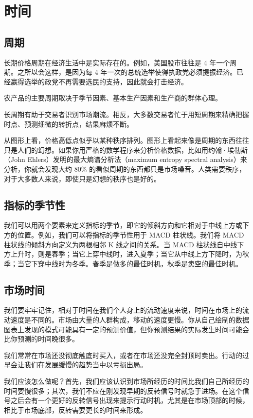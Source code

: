 \section{时间}
\subsection*{周期}
长期价格周期在经济生活中是实际存在的。例如，美国股市往往是 4 年一个周期。之所以会这样，是因为每 4 年一次的总统选举使得执政党必须提振经济。已经赢得选举的政党不再需要选民的支持，因此就会打击经济。

农产品的主要周期取决于季节因素、基本生产因素和生产商的群体心理。

长周期有助于交易者识别市场潮流。相反，大多数交易者忙于用短周期来精确把握时点、预测细微的转折点，结果麻烦不断。

从图形上看，价格高低点似乎以某种秩序排列。图形上看起来像是周期的东西往往只是人们的幻想。如果你用严格的数学程序来分析价格数据，比如用约翰·埃勒斯（John Ehlers）发明的最大熵谱分析法（maximum entropy spectral analysis）来分析，你就会发现大约 80\% 的看似周期的东西都只是市场噪音。人类需要秩序，对于大多数人来说，即使只是幻想的秩序也是好的。
\subsection*{指标的季节性}
我们可以用两个要素来定义指标的季节，即它的倾斜方向和它相对于中线上方或下方的位置。例如，我们可以将指标的季节性用于 MACD 柱状线。我们将 MACD 柱状线的倾斜方向定义为两根相邻 K 线之间的关系。当 MACD 柱状线自中线下方上升时，则是春季；当它上穿中线时，进入夏季；当它从中线上方下降时，为秋季；当它下穿中线时为冬季。春季是做多的最佳时机，秋季是卖空的最佳时机。
\subsection*{市场时间}
我们要牢牢记住，相对于时间在我们个人身上的流动速度来说，时间在市场上的流动速度是不同的。市场由大量的人群构成，移动的速度更慢。你从自己绘制的数据图表上发现的模式可能具有一定的预测价值，但你预测结果的实际发生时间可能会比你预测的时间晚很多。

我们常常在市场还没彻底触底时买入，或者在市场还没完全封顶时卖出。行动的过早会让我们在发展缓慢的趋势当中以亏损出局。

我们应该怎么做呢？首先，我们应该认识到市场所经历的时间比我们自己所经历的时间要慢很多；其次，我们不应在刚发现早期的反转信号时就急于进场。在这个信号之后会有一个更好的反转信号出现来提示行动时机，尤其是在市场顶部的时候，相比于市场底部，反转需要更长的时间来形成。
